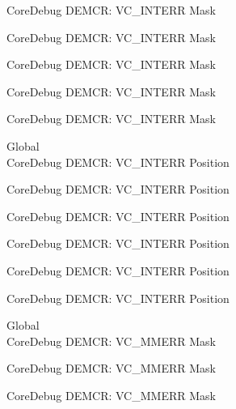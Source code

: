 \begin{DoxyRefList}
\label{deprecated__deprecated000202}%
%
Core\+Debug DEMCR\+: VC\+\_\+\+INTERR Mask 

\label{deprecated__deprecated000344}%
%
Core\+Debug DEMCR\+: VC\+\_\+\+INTERR Mask 

\label{deprecated__deprecated000420}%
%
Core\+Debug DEMCR\+: VC\+\_\+\+INTERR Mask 

\label{deprecated__deprecated000509}%
%
Core\+Debug DEMCR\+: VC\+\_\+\+INTERR Mask 

\label{deprecated__deprecated000611}%
%
Core\+Debug DEMCR\+: VC\+\_\+\+INTERR Mask  
\item[Global \doxylink{group___c_m_s_i_s___core_debug_ga22079a6e436f23b90308be97e19cf07e}{Core\+Debug\+\_\+\+DEMCR\+\_\+\+VC\+\_\+\+INTERR\+\_\+\+Pos} ]\hfill \\
\label{deprecated__deprecated000057}%
%
Core\+Debug DEMCR\+: VC\+\_\+\+INTERR Position 

\label{deprecated__deprecated000201}%
%
Core\+Debug DEMCR\+: VC\+\_\+\+INTERR Position 

\label{deprecated__deprecated000343}%
%
Core\+Debug DEMCR\+: VC\+\_\+\+INTERR Position 

\label{deprecated__deprecated000419}%
%
Core\+Debug DEMCR\+: VC\+\_\+\+INTERR Position 

\label{deprecated__deprecated000508}%
%
Core\+Debug DEMCR\+: VC\+\_\+\+INTERR Position 

\label{deprecated__deprecated000610}%
%
Core\+Debug DEMCR\+: VC\+\_\+\+INTERR Position  
\item[Global \doxylink{group___c_m_s_i_s___core_debug_gad420a9b60620584faaca6289e83d3a87}{Core\+Debug\+\_\+\+DEMCR\+\_\+\+VC\+\_\+\+MMERR\+\_\+\+Msk} ]\hfill \\
\label{deprecated__deprecated000068}%
%
Core\+Debug DEMCR\+: VC\+\_\+\+MMERR Mask 

\label{deprecated__deprecated000212}%
%
Core\+Debug DEMCR\+: VC\+\_\+\+MMERR Mask 

\label{deprecated__deprecated000354}%
%
Core\+Debug DEMCR\+: VC\+\_\+\+MMERR Mask 


\end{DoxyRefList}
